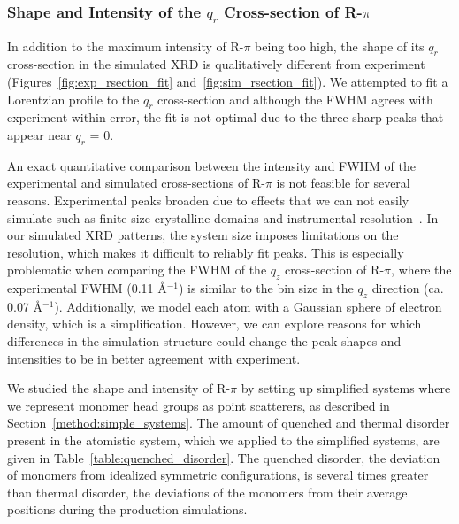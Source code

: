   \subsubsection{Shape and Intensity of the $q_r$ Cross-section of R-$\pi$}\label{section:rpi_xsection}

  In addition to the maximum intensity of R-$\pi$ being too high, the shape
  of its $q_r$ cross-section in the simulated XRD is qualitatively different
  from experiment (Figures~\ref{fig:exp_rsection_fit}
  and~\ref{fig:sim_rsection_fit}). We attempted to fit a Lorentzian profile to 
  the $q_r$ cross-section and although the FWHM agrees with experiment within
  error, the fit is not optimal due to the three sharp peaks that appear near
  $q_r$ = 0. 
  
  An exact quantitative comparison between the intensity and FWHM of the
  experimental and simulated cross-sections of R-$\pi$ is not feasible for
  several reasons. Experimental peaks broaden due to effects that we can not
  easily simulate such as finite size crystalline domains and instrumental
  resolution~\cite{girolami_x-ray_2016}. In our simulated XRD patterns, 
  the system size imposes limitations
  on the resolution, which makes it difficult to reliably fit peaks. This is
  especially problematic when comparing the FWHM of the $q_z$ cross-section of
  R-$\pi$, where the experimental FWHM (0.11 \AA$^{-1}$) is similar to the bin
  size in the $q_z$ direction (ca. 0.07 \AA$^{-1}$).  Additionally, we model each
  atom with a Gaussian sphere of electron density, which is a simplification.
  However, we can explore reasons for which differences in the simulation
  structure could change the peak shapes and intensities to be in better
  agreement with experiment.
   
  We studied the shape and intensity of R-$\pi$ by setting up simplified
  systems where we represent monomer head groups as point scatterers, as
  described in Section~\ref{method:simple_systems}. The amount of quenched and
  thermal disorder present in the atomistic system, which we applied to the
  simplified systems, are given in Table~\ref{table:quenched_disorder}. The
  quenched disorder, the deviation of monomers from idealized symmetric
  configurations, is several times greater than thermal disorder, the 
  deviations of the monomers from their average positions during the 
  production simulations.
  
